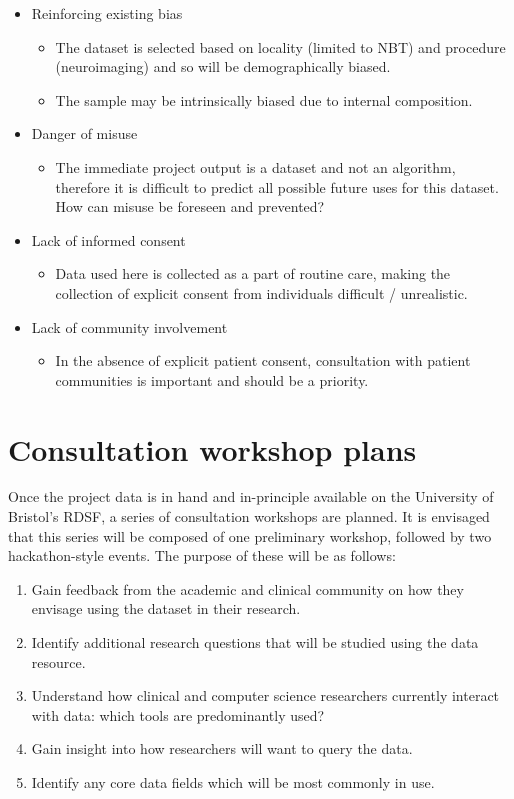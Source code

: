 \documentclass{article}
\begin{document}
\begin{itemize}
\item Reinforcing existing bias
  \begin{itemize}
  \item The dataset is selected based on locality (limited to NBT)
    and procedure (neuroimaging) and so will be demographically
    biased.
  \item The sample may be intrinsically biased due to internal composition.
  \end{itemize}
\item Danger of misuse
  \begin{itemize}
  \item The immediate project output is a dataset and not an
    algorithm, therefore it is difficult to predict all possible
    future uses for this dataset. How can misuse be foreseen and prevented?
  \end{itemize}
\item Lack of informed consent
  \begin{itemize}
  \item Data used here is collected as a part of routine care, making
    the collection of explicit consent from individuals difficult / unrealistic.
  \end{itemize}     
\item Lack of community involvement
  \begin{itemize}
  \item In the absence of explicit patient consent, consultation with
    patient communities is important and should be a priority.
  \end{itemize}     
\end{itemize}


\section{Consultation workshop plans}

Once the project data is in hand and in-principle available on the
University of Bristol's RDSF, a series of consultation workshops are
planned. It is envisaged that this series will be composed of one
preliminary workshop, followed by two hackathon-style events.
The purpose of these will be as follows:

\begin{enumerate}
\item Gain feedback from the academic and clinical
  community on how they envisage using the dataset in their
  research. 
\item Identify additional research questions that will be studied using the data
  resource.
\item Understand how clinical and computer science researchers
  currently interact with data: which tools are predominantly used?
\item Gain insight into how researchers will want to query the
  data.
\item Identify any core data fields which will be most commonly
  in use.
\end{enumerate}
\end{document}
